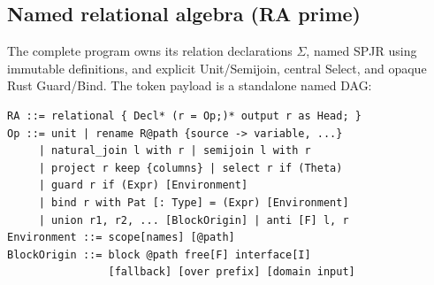 \subsection{Named relational algebra (RA prime)}
The complete program owns its relation declarations $\Sigma$, named SPJR
using immutable definitions, and explicit
Unit/Semijoin, central Select, and opaque Rust Guard/Bind. The token payload is a standalone named DAG:
\begin{lstlisting}
RA ::= relational { Decl* (r = Op;)* output r as Head; }
Op ::= unit | rename R@path {source -> variable, ...}
     | natural_join l with r | semijoin l with r
     | project r keep {columns} | select r if (Theta)
     | guard r if (Expr) [Environment]
     | bind r with Pat [: Type] = (Expr) [Environment]
     | union r1, r2, ... [BlockOrigin] | anti [F] l, r
Environment ::= scope[names] [@path]
BlockOrigin ::= block @path free[F] interface[I]
                [fallback] [over prefix] [domain input]
\end{lstlisting}

